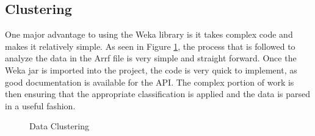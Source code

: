 \subsection{Clustering}
One major advantage to using the Weka library is it takes complex code and makes
it relatively simple.  As seen in Figure \ref{fig:clustering}, the process that is
followed to analyze the data in the Arrf file is very simple and straight
forward.  Once the Weka jar is imported into the project, the code is very quick
to implement, as good documentation is available for the API.\cite{weka}  The
complex portion of work is then ensuring that the appropriate classification is
applied and the data is parsed in a useful fashion.


\usetikzlibrary{shapes,arrows,chains}

\begin{figure}[H]
	\centering
	\caption{Data Clustering}
	\label{fig:clustering}
\end{figure}
